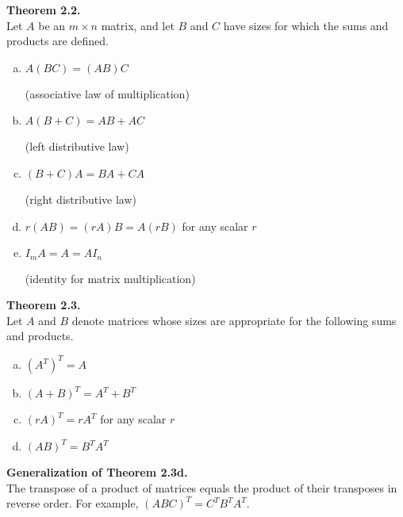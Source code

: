 \documentclass[10pt]{book}
\newenvironment{boxthm}{\begin{mdframed}[backgroundcolor=gray!30,nobreak=true]}{\end{mdframed}}
\begin{document}
\begin{boxthm}
	\textbf{Theorem 2.2.} \\
	Let $A$ be an $m\times n$ matrix, and let $B$ and $C$ have sizes for which the sums and products are defined.
	\setlength\multicolsep{0pt}
	\begin{multicols}{2}
		\begin{enumerate}[(a)]
			\item $A(BC)=(AB)C$ \par
				(associative law of multiplication)
			\item $A(B+C)=AB+AC$ \par
				(left distributive law)
			\item $(B+C)A=BA+CA$ \par
				(right distributive law)
			\columnbreak
			\item $r(AB)=(rA)B=A(rB)$ for any scalar $r$
			\item $I_mA=A=AI_n$ \par
				(identity for matrix multiplication)
		\end{enumerate}
	\end{multicols}
\end{boxthm}

\begin{boxthm}
	\textbf{Theorem 2.3.} \\
	Let $A$ and $B$ denote matrices whose sizes are appropriate for the following sums and products.
	\setlength\multicolsep{0pt}
	\begin{multicols}{2}
		\begin{enumerate}[(a)]
			\item $\left(A^T\right)^T=A$
			\item $(A+B)^T=A^T+B^T$
			\item $(rA)^T=rA^T$ for any scalar $r$
			\item $(AB)^T=B^TA^T$
		\end{enumerate}
	\end{multicols}
\end{boxthm}

\begin{boxthm}
	\textbf{Generalization of Theorem 2.3d.} \\
	The transpose of a product of matrices equals the product of their transposes in reverse order.
	For example, $\left(ABC\right)^T=C^TB^TA^T$.
\end{boxthm}
\end{document}

